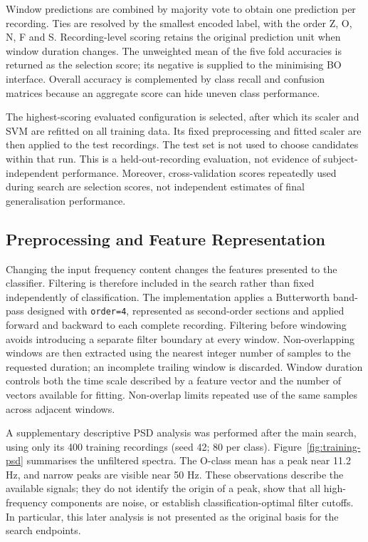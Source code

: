 Window predictions are combined by majority vote to obtain one prediction per
recording. Ties are resolved by the smallest encoded label, with the order
Z, O, N, F and S. Recording-level scoring retains the original prediction unit
when window duration changes. The unweighted mean of the five fold accuracies
is returned as the selection score; its negative is supplied to the minimising
BO interface. Overall accuracy is complemented by class recall and confusion
matrices because an aggregate score can hide uneven class performance.

The highest-scoring evaluated configuration is selected, after which its
scaler and SVM are refitted on all training data. Its fixed preprocessing and
fitted scaler are then applied to the test recordings. The test set is not
used to choose candidates within that run. This is a held-out-recording
evaluation, not evidence of subject-independent performance. Moreover,
cross-validation scores repeatedly used during search are selection scores,
not independent estimates of final generalisation performance.

\subsection{Preprocessing and Feature Representation}
\label{subsec:preprocessing-features}

Changing the input frequency content changes the features presented to the
classifier. Filtering is therefore included in the search rather than fixed
independently of classification. The implementation applies a Butterworth
band-pass designed with \texttt{order=4}, represented as second-order sections
and applied forward and backward to each complete recording. Filtering before
windowing avoids introducing a separate filter boundary at every window.
Non-overlapping windows are then extracted using the nearest integer number
of samples to the requested duration; an incomplete trailing window is
discarded. Window duration controls both the time scale described by a feature
vector and the number of vectors available for fitting. Non-overlap limits
repeated use of the same samples across adjacent windows.

A supplementary descriptive PSD analysis was performed after the main search,
using only its 400 training recordings (seed 42; 80 per class).
Figure~\ref{fig:training-psd} summarises the unfiltered spectra. The O-class mean
has a peak near 11.2 Hz, and narrow peaks are visible near 50 Hz. These
observations describe the available signals; they do not identify the origin
of a peak, show that all high-frequency components are noise, or establish
classification-optimal filter cutoffs. In particular, this later analysis is
not presented as the original basis for the search endpoints.

